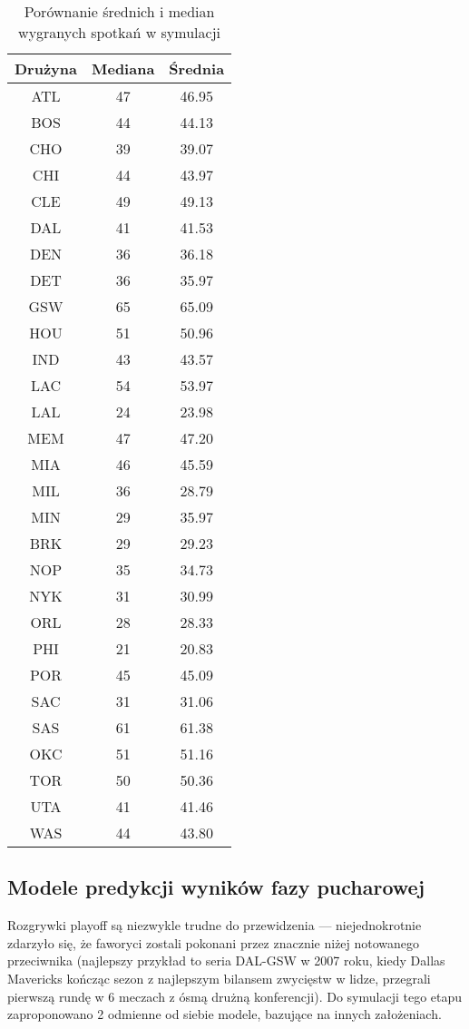 \documentclass[inzynierska]{pwr_wmat_praca_dyplomowa}
\theoremstyle{plain}
\numberwithin{theorem}{chapter}
\theoremstyle{definition}
\numberwithin{theorem}{chapter}
\begin{document}
\begin{table}[]
	\centering
	\begin{tabular}{|c|c|c|}
		\hline
		\textbf{Drużyna}      & \textbf{Mediana} & \textbf{Średnia} \\ \hline
		ATL & 47 & 46.95\\ \hline
		BOS & 44 & 44.13\\ \hline
		CHO & 39 & 39.07\\ \hline
		CHI & 44 & 43.97\\ \hline
		CLE & 49 & 49.13\\ \hline
		DAL & 41 & 41.53\\ \hline
		DEN & 36 & 36.18\\ \hline
		DET & 36 & 35.97\\ \hline
		GSW & 65 & 65.09\\ \hline
		HOU & 51 & 50.96\\ \hline
		IND & 43 & 43.57\\ \hline
		LAC & 54 & 53.97\\ \hline
		LAL & 24 & 23.98\\ \hline
		MEM & 47 & 47.20\\ \hline
		MIA & 46 & 45.59\\ \hline
		MIL & 36 & 28.79\\ \hline
		MIN & 29 & 35.97\\ \hline
		BRK & 29 & 29.23\\ \hline
		NOP & 35 & 34.73\\ \hline
		NYK & 31 & 30.99\\ \hline
		ORL & 28 & 28.33\\ \hline
		PHI & 21 & 20.83\\ \hline
		POR & 45 & 45.09\\ \hline
		SAC & 31 & 31.06\\ \hline
		SAS & 61 & 61.38\\ \hline
		OKC & 51 & 51.16\\ \hline
		TOR & 50 & 50.36\\ \hline
		UTA & 41 & 41.46\\ \hline
		WAS & 44 & 43.80\\ \hline
	\end{tabular}
\caption{Porównanie średnich i median wygranych spotkań w symulacji}\label{srednie_mediany}	
\end{table}
\subsection{Modele predykcji wyników fazy pucharowej}\label{modele_palyoff}
Rozgrywki playoff są niezwykle trudne do przewidzenia --- niejednokrotnie zdarzyło się, że faworyci zostali pokonani przez znacznie niżej notowanego przeciwnika (najlepszy przykład to seria DAL-GSW w 2007 roku, kiedy Dallas Mavericks kończąc sezon z najlepszym bilansem zwycięstw w lidze, przegrali pierwszą rundę w 6 meczach z ósmą drużną konferencji).
Do symulacji tego etapu zaproponowano 2 odmienne od siebie modele, bazujące na innych założeniach.
\end{document}
